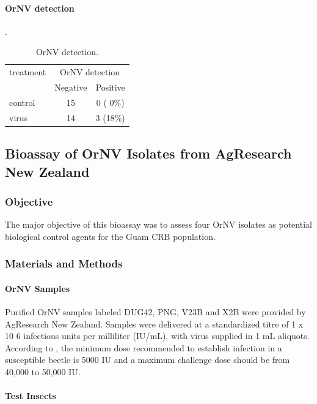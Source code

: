 \documentclass[12pt,letterpaper,english,bibliography=totocnumbered, abstract=on]{scrartcl}
\begin{document}
\clearpage
\paragraph{OrNV detection}.

\begin{table}[H]
	\centering
	\caption{OrNV detection.}
	\label{ornv detection}
	\begin{tabular}{lcc}
		\hline
		treatment  & \multicolumn{2}{c}{OrNV detection} \\ \cline{2-3}
		& Negative & Positive \\
		\hline
		control    & 15 & 0 ( 0\%)\\
		virus      & 14 & 3 (18\%)\\
		\hline
	\end{tabular}
\end{table}

\clearpage
\subsection{Bioassay of OrNV Isolates from AgResearch New Zealand}

\subsubsection{Objective}

The major objective of this bioassay was to assess four OrNV isolates as potential biological control agents for the Guam CRB population. 

\subsubsection{Materials and Methods}

\paragraph{OrNV Samples}

Purified OrNV samples labeled DUG42, PNG, V23B and X2B were provided by AgResearch New Zealand.
Samples were delivered at a standardized titre of 1 x 10 6 infectious units per milliliter (IU/mL), with virus supplied in 1 mL
aliquots. According to \cite{AgResearch2023-OrNV-prep2023}, the minimum dose recommended to establish infection in a susceptible beetle is 5000 IU and a maximum challenge dose should be from 40,000 to 50,000 IU.

\paragraph{Test Insects}
\end{document}
